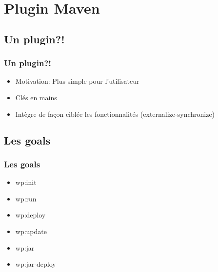 \documentclass[12pt,a4paper,utf8x]{beamer}
\begin{document}
\section{Plugin Maven}
\subsection{Un plugin?!}
\begin{frame}\frametitle{Un plugin?!}
\begin{itemize}
\item Motivation: Plus simple pour l'utilisateur
\item Clés en mains
\item Intègre de façon ciblée les fonctionnalités (externalize-synchronize)
\end{itemize}
\end{frame}	

\subsection{Les goals}
\begin{frame}\frametitle{Les goals}
\begin{itemize}
\item wp:init
\item wp:run
\item wp:deploy
\item wp:update
\item wp:jar
\item wp:jar-deploy
\end{itemize}

\end{frame}	
\end{document}
